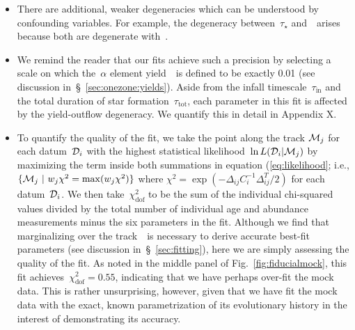\documentclass[ms.tex]{subfiles}
\begin{document}
\begin{itemize}


	\item There are additional, weaker degeneracies which can be understood
	by confounding variables.
	For example, the degeneracy between~$\tau_\star$ and~\yfeia~arises because
	both are degenerate with~\yfecc.

	\item We remind the reader that our fits achieve such a precision by
	selecting a scale on which the~$\alpha$ element yield~\yacc~is defined to
	be exactly 0.01 (see discussion in~\S~\ref{sec:onezone:yields}).
	Aside from the infall timescale~$\tau_\text{in}$ and the total duration of
	star formation~$\tau_\text{tot}$, each parameter in this fit is affected by
	the yield-outflow degeneracy.
	We quantify this in detail in Appendix X.

	\item To quantify the quality of the fit, we take the point along the track
	$\mathcal{M}_j$ for each datum~$\mathcal{D}_i$ with the highest statistical
	likelihood~$\ln L(\mathcal{D}_i | \mathcal{M}_j)$ by maximizing the term
	inside both summations in equation (\ref{eq:likelihood}; i.e.,
	$\{\mathcal{M}_j~|~w_j \chi^2 = \max(w_j \chi^2)\}$ where
	$\chi^2 = \exp(-\Delta_{ij}C_i^{-1}\Delta_{ij}^T/2)$ for each
	datum~$\mathcal{D}_i$.
	We then take~$\chi_\text{dof}^2$ to be the sum of the individual
	chi-squared values divided by the total number of individual age and
	abundance measurements minus the six parameters in the fit.
	Although we find that marginalizing over the track~~is necessary
	to derive accurate best-fit parameters (see discussion
	in~\S~\ref{sec:fitting}), here we are simply assessing the quality of the
	fit.
	As noted in the middle panel of Fig.~\ref{fig:fiducialmock}, this fit
	achieves~$\chi_\text{dof}^2 = 0.55$, indicating that we have perhaps
	over-fit the mock data.
	This is rather unsurprising, however, given that we have fit the mock data
	with the exact, known parametrization of its evolutionary history in the
	interest of demonstrating its accuracy.

\end{itemize}
\end{document}
